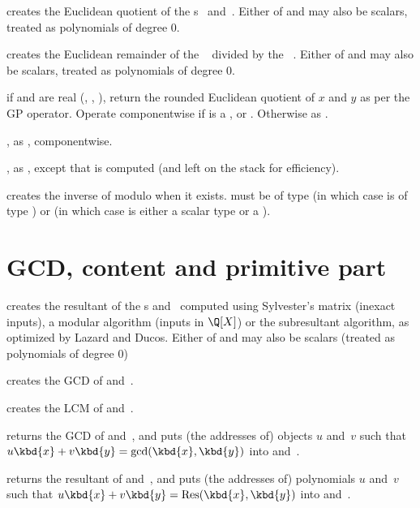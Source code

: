  creates the Euclidean quotient of the
s~ and~. Either of  and  may also be
scalars, treated as polynomials of degree $0$.

 creates the Euclidean remainder of the
~ divided by the ~. Either of  and
 may also be scalars, treated as polynomials of degree $0$.


 if  and  are real
(, , ), return the rounded Euclidean quotient of
$x$ and $y$ as per the \kbd{\bs/} GP operator. Operate componentwise if
 is a ,  or . Otherwise as .

, as ,
componentwise.

, as , except that
 is computed (and left on the stack for efficiency).

 creates the inverse of  modulo 
when it exists.  must be of type  (in which case  is
of type ) or  (in which case  is either a scalar
type or a ).

\section{GCD, content and primitive part}


 creates the resultant of the s
 and~ computed using Sylvester's matrix (inexact inputs), a
modular algorithm (inputs in $\Q[X]$) or the subresultant algorithm, as
optimized by Lazard and Ducos. Either of  and  may also be
scalars (treated as polynomials of degree $0$)

 creates the GCD of  and~.

 creates the LCM of  and~.

 returns the GCD of 
and~, and puts (the addresses of) objects $u$ and~$v$ such that
$u\kbd{x}+v\kbd{y}=\gcd(\kbd{x},\kbd{y})$ into  and~.

 returns the resultant
of  and~, and puts (the addresses of) polynomials $u$ and~$v$
such that $u\kbd{x}+v\kbd{y}=\text{Res}(\kbd{x},\kbd{y})$ into 
and~.

